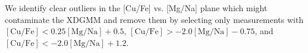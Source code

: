 We identify clear outliers in the [Cu/Fe] vs. [Mg/Na] plane which might contaminate the XDGMM and remove them by selecting only measurements with $\mathrm{[Cu/Fe]} < 0.25 \mathrm{[Mg/Na]} + 0.5$, $\mathrm{[Cu/Fe]} > -2.0 \mathrm{[Mg/Na]} - 0.75$, and $\mathrm{[Cu/Fe]} < -2.0 \mathrm{[Mg/Na]} + 1.2$.
